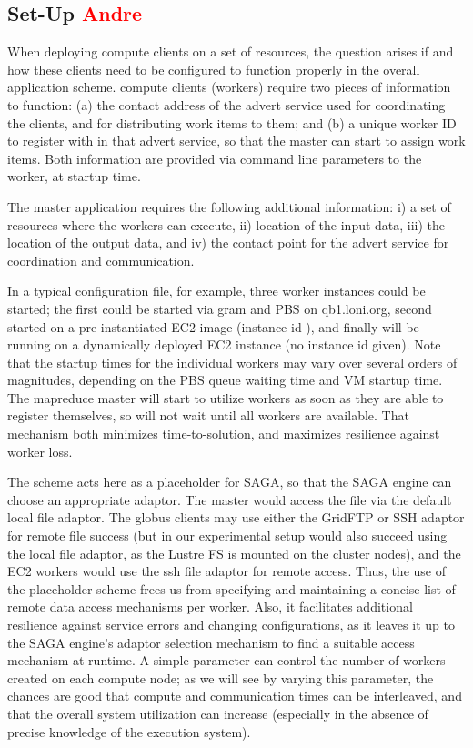 \documentclass[3p,twocolumn]{elsarticle}
\begin{document}
\subsection{\sagamapreduce Set-Up \textcolor{red}{Andre}}

When deploying compute clients on a  set of resources, the
question arises if and how these clients need to be configured to
function properly in the overall application scheme.  \sagamapreduce
compute clients (workers) require two pieces of information to
function: (a) the contact address of the advert service used for
coordinating the clients, and for distributing work items to them; and
(b) a unique worker ID to register with in that advert service, so
that the master can start to assign work items.  Both information are
provided via command line parameters to the worker, at startup time.

The master application requires the following additional information:
i) a set of resources where the workers can execute, ii) location of
the input data, iii) the location of the output data, and iv) the
contact point for the advert service for coordination and
communication.  

In a typical configuration file, for example, three worker instances
could be started; the first could be started via gram and PBS on
qb1.loni.org, second started on a pre-instantiated EC2 image
(instance-id ), and finally will be running on a
dynamically deployed EC2 instance (no instance id given).  Note that
the startup times for the individual workers may vary over several
orders of magnitudes, depending on the PBS queue waiting time and VM
startup time.  The mapreduce master will start to utilize workers as
soon as they are able to register themselves, so will not wait until
all workers are available.  That mechanism both minimizes
time-to-solution, and maximizes resilience against worker loss.

The scheme  acts here as a placeholder for SAGA, so that the
SAGA engine can choose an appropriate adaptor.  The master would
access the file via the default local file adaptor.  The globus
clients may use either the GridFTP or SSH adaptor for remote file
success (but in our experimental setup would also succeed 
using the local file adaptor, as the Lustre FS is mounted on the
cluster nodes), and the EC2 workers would use the ssh file adaptor for
remote access.  Thus, the use of the placeholder scheme frees us from
specifying and maintaining a concise list of remote data access
mechanisms per worker.  Also, it facilitates additional resilience
against service errors and changing configurations, as it leaves it up
to the SAGA engine's adaptor selection mechanism to find a suitable
access mechanism at runtime.
A simple parameter can control the number of workers created on each
compute node; as we will see by varying this parameter, the chances
are good that compute and communication times can be interleaved, and
that the overall system utilization can increase (especially in the
absence of precise knowledge of the execution system).
 
\end{document}
